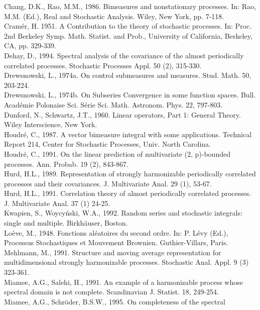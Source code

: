 \documentclass{article}
\begin{document}
Chang, D.K., Rao, M.M., 1986. Bimeasures and nonstationary processes. In: Rao,
M.M. (Ed.), Real and Stochastic Analysis. Wiley, New York, pp. 7-118.\\
Cram{\'e}r, H. 1951. A Contribution to the theory of stochastic processes. In:
Proc. 2nd Berkeley Symp. Math. Statist. and Prob., University of California,
Berkeley, CA, pp. 329-339.\\
Dehay, D., 1994. Spectral analysis of the covariance of the almost
periodically correlated processes. Stochastic Processes Appl. 50 (2),
315-330.\\
Drewsnowski, L., 1974a. On control submeasures and measures. Stud. Math. 50,
203-224.\\
Drewsnowski, L., 1974b. On Subseries Convergence in some function spaces.
Bull. Acad{\'e}mie Polonaise Sci. S{\'e}rie Sci. Math. Astronom. Phys. 22,
797-803.\\
Dunford, N., Schwartz, J.T., 1960. Linear operators, Part 1: General Theory.
Wiley Interscience, New York.\\
Houdr{\'e}, C., 1987. A vector bimeasure integral with some applications.
Technical Report 214, Center for Stochastic Processes, Univ. North Carolina.\\
Houdr{\'e}, C., 1991. On the linear prediction of multivariate (2, p)-bounded
processes. Ann. Probab. 19 (2), 843-867.\\
Hurd, H.L., 1989. Representation of strongly harmonizable periodically
correlated processes and their covariances. J. Multivariate Anal. 29 (1),
53-67.\\
Hurd, H.L., 1991. Correlation theory of almost periodically correlated
processes. J. Multivariate Anal. 37 (1) 24-25.\\
Kwapien, S., Woycy{\'n}ski, W.A., 1992. Random series and stochastic
integrals: single and multiple. Birkh{\"a}user, Boston.\\
Lo{\`e}ve, M., 1948. Fonctions al{\'e}atoires du second ordre. In: P. L{\'e}vy
(Ed.), Processus Stochastiques et Mouvement Brownien. Guthier-Villars,
Paris.\\
Mehlmann, M., 1991. Structure and moving average representation for
multidimensional strongly harmonizable processes. Stochastic Anal. Appl. 9 (3)
323-361.\\
Miamee, A.G., Salehi, H., 1991. An example of a harmonizable process whose
spectral domain is not complete. Scandinavian J. Statist. 18, 249-254.\\
Miamee, A.G., Schr{\"o}der, B.S.W., 1995. On completeness of the spectral
\end{document}
